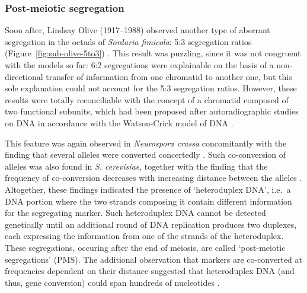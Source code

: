 \subsubsection{Post-meiotic segregation}

Soon after, Lindsay Olive (1917--1988) observed another type of aberrant segregation in the octads of \textit{Sordaria fimicola}: 5:3 segregation ratios (Figure~\ref{fig:sub-olive-5to3}) \citep{olive1959aberrant, kitani1962genetics}.
This result was puzzling, since it was not congruent with the models so far: 6:2 segregations were explainable on the basis of a non-directional transfer of information from one chromatid to another one, but this sole explanation could not account for the 5:3 segregation ratios. 
However, these results were totally reconciliable with the concept of a chromatid composed of two functional subunits, which had been proposed after autoradiographic studies on DNA \citep{taylor1957organization} in accordance with the Watson-Crick model of DNA \citep{watson1953molecular}.

This feature was again observed in \textit{Neurospora crassa} concomitantly with the finding that several alleles were converted concertedly \citep{case1964allelic}. 
Such co-conversion of alleles was also found in \textit{S. cerevisiae}, together with the finding that the frequency of co-conversion decreases with increasing distance between the alleles \citep[\cite{fogel1969informational}, reviewed in][]{orr1985fungal}.\\


Altogether, these findings indicated the presence of ‘heteroduplex DNA’, i.e.\ a DNA portion where the two strands composing it contain different information for the segregating marker.
Such heteroduplex DNA cannot be detected genetically until an additional round of DNA replication produces two duplexes, each expressing the information from one of the strands of the heteroduplex.
These segregations, occuring after the end of meiosis, are called ‘post-meiotic segregations’ (PMS).
The additional observation that markers are co-converted at frequencies dependent on their distance suggested that heteroduplex DNA (and thus, gene conversion) could span hundreds of nucleotides \citep{orr1985fungal}.





